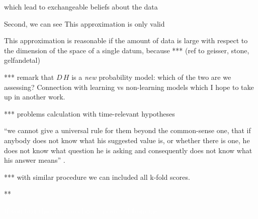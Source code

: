 \documentclass[\ifafour a4paper,12pt,\else a5paper,10pt,\fi%
onecolumn,oneside,article,%
british%
]{memoir}
\theoremstyle{remark}
\theoremstyle{innote}
\newcommand*{\citep}{\parencites}
\renewcommand*{\|}[1][]{\nonscript\,#1\vert\nonscript\;\mathopen{}}
\newcommand*{\sect}{\S}%
\begin{document}
which lead to
exchangeable beliefs about the data

Second, we can see 
This approximation is only valid

This approximation is reasonable if the amount of data is large with
respect to the dimension of the space of a single datum, because *** (ref
to geisser, stone, gelfandetal)

*** remark that $D\,H$ is a \emph{new} probability model: which of the two
are we assessing? Connection with learning vs non-learning models which I
hope to take up in another work.


*** problems calculation with time-relevant hypotheses


\enquote{we cannot give a universal rule for them beyond the common-sense one, that if anybody does not know what his suggested value is, or whether there is one, he does not know what question he is asking and consequently does not know what his answer means} \citep[\sect~3.1 p.~124 ]{jeffreys1939_r1983}.


*** with similar procedure we can included all k-fold scores.


**



\textcolor{white}{If you find this you can claim a postcard from me.}









\end{document}
